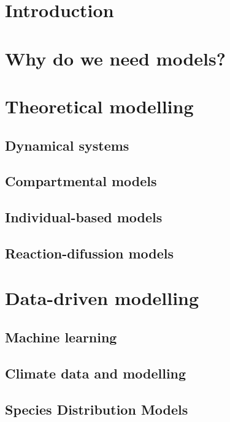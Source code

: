 \section{\label{sec:Introduction_2} Introduction}

\section{\label{sec:Why do we need models?} Why do we need models?}

\section{\label{sec:Theoretical modelling} Theoretical modelling}

\subsection{\label{sec:Dynamical systems} Dynamical systems}

\subsection{\label{sec:Compartmental models} Compartmental
  models}

\subsection{\label{sec:Individual-based models} Individual-based models}

\subsection{\label{sec:Reaction-diffusion models} Reaction-difussion models}

\section{\label{sec:Data-driven modelling} Data-driven modelling}

\subsection{\label{sec:Machine learning} Machine learning}

\subsection{\label{sec:Climate data and modelling} Climate data and
  modelling}

\subsection{\label{sec:Species Distribution Models} Species Distribution
  Models}